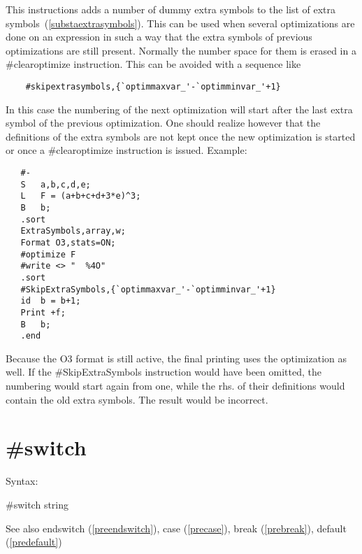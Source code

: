 \noindent This instructions adds a number of dummy extra 
symbols to the list of extra 
symbols~(\ref{substaextrasymbols}). This can be used when several 
optimizations are done on an expression in such a way that the extra 
symbols of previous optimizations are still present. Normally the number 
space for them is erased in a \#clearoptimize instruction. This can be 
avoided with a sequence like
\begin{verbatim}
	#skipextrasymbols,{`optimmaxvar_'-`optimminvar_'+1}
\end{verbatim}
In this case the numbering of the next optimization will start after the 
last extra symbol of the previous optimization.
One should realize however that the definitions of the extra symbols are 
not kept once the new optimization is started or once a \#clearoptimize 
instruction is issued. Example:
\begin{verbatim}
   #-
   S   a,b,c,d,e;
   L   F = (a+b+c+d+3*e)^3;
   B   b;
   .sort
   ExtraSymbols,array,w;
   Format O3,stats=ON;
   #optimize F
   #write <> "  %4O"
   .sort
   #SkipExtraSymbols,{`optimmaxvar_'-`optimminvar_'+1}
   id  b = b+1;
   Print +f;
   B   b;
   .end
\end{verbatim}
Because the O3 format is still active, the final printing uses the 
optimization as well. If the \#SkipExtraSymbols instruction would have been 
omitted, the numbering would start again from one, while the rhs. of their 
definitions would contain the old extra symbols. The result would be 
incorrect.


\section{\#switch}
\label{preswitch}

\noindent Syntax:

\#switch string
 
\noindent See also endswitch (\ref{preendswitch}),
        case (\ref{precase}),
        break (\ref{prebreak}),
        default (\ref{predefault})

